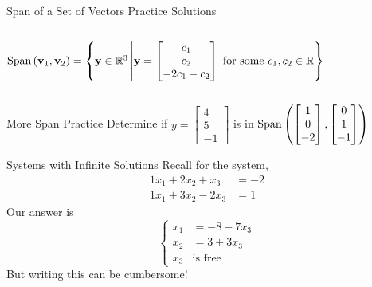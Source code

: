 \documentclass[xcoler=dvipsnames, aspectratio=169]{beamer}
\begin{document}
{\begin{frame}{Span of a Set of Vectors Practice Solutions}
\begin{columns}
\begin{enumerate}
                    {\scriptsize $
                        \text{Span}\left(\mathbf{v}_1,\mathbf{v}_2\right) = \left\{\mathbf{y}\in\mathbb{R}^3\left|\mathbf{y}=\begin{bmatrix}c_1\\c_2\\-2c_1-c_2
                        \end{bmatrix}\text{ for some }c_1,c_2\in\mathbb{R}\right\}\right.
                    $}
            \end{enumerate}
        \end{columns}
    \end{frame}
    }{}
    \begin{frame}{More Span Practice}
        \centering
        Determine if $y=
            \begin{bmatrix}
                4\\5\\-1
            \end{bmatrix}$
 is in $\text{Span}\left(\begin{bmatrix}1\\0\\-2\end{bmatrix},
            \begin{bmatrix}0\\1\\-1\end{bmatrix}\right)$
                \iftoggle{showSolutions}{

                    \vspace{20pt}\pause
                    Perform Gaussian Elimination on the augmented matrix\pause
                    \[
                        \aMat{cc|c}{
                            1 & 0 & 4\\
                            0 & 1 & 5\\
                            -2&-1 &-1
                        }\pause\rightarrow\aMat{cc|c}{
                            1 & 0 & 4\\
                            0 & 1 & 5\\
                            0 & 0 & 12
                        }
                    \]
                    \pause
                    No!
                }{\vspace{150pt}}
    \end{frame}
    \begin{frame}{Systems with Infinite Solutions}
        \small
        Recall for the system,
        \begin{align*}
            1x_1 + 2x_2 + x_3 &= -2\\
            1x_1 + 3x_2 - 2x_3&= 1
        \end{align*}
        Our answer is
        \pause
        \[
            \begin{cases}
                x_1 &= -8-7x_3\\
                x_2 &= 3+3x_3\\
                x_3 &\text{is free}
            \end{cases}
        \]
        \pause
        But writing this can be cumbersome!
    \end{frame}
\end{document}
